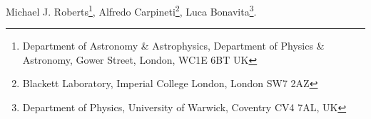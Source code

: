 Michael J. Roberts\footnote{\tiny{Department of Astronomy \& Astrophysics, Department of Physics & Astronomy, Gower Street, London, WC1E 6BT UK}}, Alfredo Carpineti\footnote{\tiny{Blackett Laboratory, Imperial College London, London SW7 2AZ}}, Luca Bonavita\footnote{\tiny{Department of Physics, University of Warwick, Coventry CV4 7AL, UK}}. 